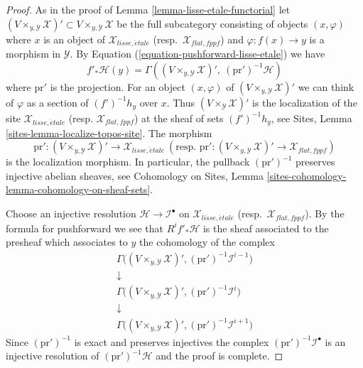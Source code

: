 \documentclass{stacks-project}
\theoremstyle{plain}
\theoremstyle{definition}
\theoremstyle{remark}
\numberwithin{equation}{subsection}
\def\etale{{\acute{e}tale}}
\begin{document}
\begin{proof}
As in the proof of Lemma \ref{lemma-lisse-etale-functorial}
let $(V \times_{y, \mathcal{Y}} \mathcal{X})' \subset
V \times_{y, \mathcal{Y}} \mathcal{X}$ be the full subcategory
consisting of objects $(x, \varphi)$ where $x$ is an object of
$\mathcal{X}_{lisse,\etale}$ (resp.\ $\mathcal{X}_{flat,fppf}$)
and $\varphi : f(x) \to y$ is a morphism in $\mathcal{Y}$.
By Equation (\ref{equation-pushforward-lisse-etale}) 
we have
$$
f'_*\mathcal{H}(y) =
\Gamma((V \times_{y, \mathcal{Y}} \mathcal{X})',
\ (\text{pr}')^{-1}\mathcal{H})
$$
where $\text{pr}'$ is the projection. For an object $(x, \varphi)$
of $(V \times_{y, \mathcal{Y}} \mathcal{X})'$
we can think of $\varphi$ as a section of $(f')^{-1}h_y$ over $x$.
Thus $(V \times_\mathcal{Y} \mathcal{X})'$ is the localization
of the site $\mathcal{X}_{lisse,\etale}$
(resp. $\mathcal{X}_{flat,fppf}$) at the sheaf of sets $(f')^{-1}h_y$, see
Sites, Lemma \ref{sites-lemma-localize-topos-site}. The morphism
$$
\text{pr}' : (V \times_{y, \mathcal{Y}} \mathcal{X})'
\to \mathcal{X}_{lisse,\etale}
\ (\text{resp. }
\text{pr}' : (V \times_{y, \mathcal{Y}} \mathcal{X})'
\to \mathcal{X}_{flat,fppf})
$$
is the localization morphism.
In particular, the pullback $(\text{pr}')^{-1}$ preserves
injective abelian sheaves, see
Cohomology on Sites, Lemma
\ref{sites-cohomology-lemma-cohomology-on-sheaf-sets}.

\medskip\noindent
Choose an injective resolution $\mathcal{H} \to \mathcal{I}^\bullet$
on $\mathcal{X}_{lisse,\etale}$ (resp.\ $\mathcal{X}_{flat,fppf}$).
By the formula for pushforward we see that $R^if'_*\mathcal{H}$ is the
sheaf associated to the presheaf which associates to $y$ the cohomology
of the complex
$$
\begin{matrix}
\Gamma\Big((V \times_{y, \mathcal{Y}} \mathcal{X})',
(\text{pr}')^{-1}\mathcal{I}^{i - 1}\Big) \\
\downarrow \\
\Gamma\Big((V \times_{y, \mathcal{Y}} \mathcal{X})',
(\text{pr}')^{-1}\mathcal{I}^i\Big) \\
\downarrow \\
\Gamma\Big((V \times_{y, \mathcal{Y}} \mathcal{X})',
(\text{pr}')^{-1}\mathcal{I}^{i + 1}\Big)
\end{matrix}
$$
Since $(\text{pr}')^{-1}$ is exact and preserves injectives the
complex $(\text{pr}')^{-1}\mathcal{I}^\bullet$ is an
injective resolution of $(\text{pr}')^{-1}\mathcal{H}$
and the proof is complete.
\end{proof}
\end{document}
